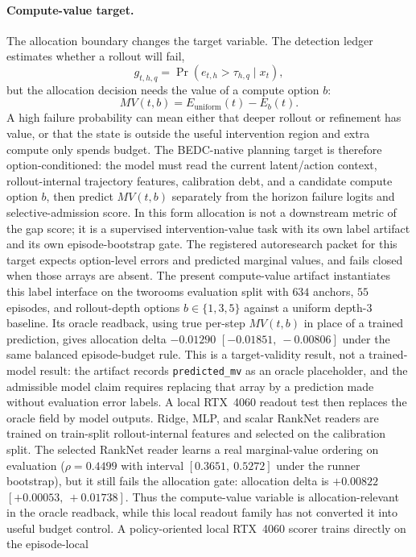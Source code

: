 \paragraph{Compute-value target.}
The allocation boundary changes the target variable.  The detection ledger
estimates whether a rollout will fail,
$$
g_{t,h,q} = \Pr(e_{t,h} > \tau_{h,q} \mid x_t),
$$
but the allocation decision needs the value of a compute option $b$:
$$
MV(t,b) = E_{\mathrm{uniform}}(t) - E_b(t).
$$
A high failure probability can mean either that deeper rollout or refinement
has value, or that the state is outside the useful intervention region and
extra compute only spends budget.  The BEDC-native planning target is therefore
option-conditioned: the model must read the current latent/action context,
rollout-internal trajectory features, calibration debt, and a candidate
compute option $b$, then predict $MV(t,b)$ separately from the horizon failure
logits and selective-admission score.  In this form allocation is not a
downstream metric of the gap score; it is a supervised intervention-value task
with its own label artifact and its own episode-bootstrap gate.  The registered
autoresearch packet for this target expects option-level errors and predicted
marginal values, and fails closed when those arrays are absent.
The present compute-value artifact instantiates this label interface on the
tworooms evaluation split with $634$ anchors, $55$ episodes, and rollout-depth
options $b\in\{1,3,5\}$ against a uniform depth-$3$ baseline.  Its oracle
readback, using true per-step $MV(t,b)$ in place of a trained prediction, gives
allocation delta $-0.01290$ $[-0.01851,\ -0.00806]$ under the same balanced
episode-budget rule.  This is a target-validity result, not a trained-model
result: the artifact records \texttt{predicted\_mv} as an oracle placeholder,
and the admissible model claim requires replacing that array by a prediction
made without evaluation error labels.
A local RTX~4060 readout test then replaces the oracle field by model outputs.
Ridge, MLP, and scalar RankNet readers are trained on train-split
rollout-internal features and selected on the calibration split.  The selected
RankNet reader learns a real marginal-value ordering on evaluation
($\rho=0.4499$ with interval $[0.3651,\ 0.5272]$ under the runner bootstrap),
but it still fails the allocation gate: allocation delta is $+0.00822$
$[+0.00053,\ +0.01738]$.  Thus the compute-value variable is
allocation-relevant in the oracle readback, while this local readout family has
not converted it into useful budget control.
A policy-oriented local RTX~4060 scorer trains directly on the episode-local
